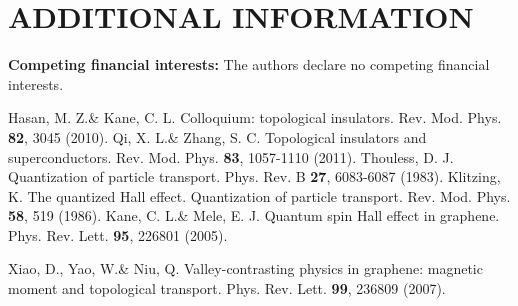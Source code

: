 \documentclass[aps,preprint,onecolumn,showpacs,superscriptaddress,groupedaddress]{revtex4}  %
\begin{document}
\section*{ADDITIONAL INFORMATION}
\textbf{Competing financial interests:} The authors declare no competing financial interests.

\begin{thebibliography}{99}
 Hasan, M. Z.\& Kane, C. L. Colloquium: topological insulators. Rev. Mod. Phys. \textbf{82}, 3045 (2010).
	Qi, X. L.\& Zhang, S. C. Topological insulators and superconductors. Rev. Mod. Phys. \textbf{83}, 1057-1110 (2011).
 Thouless, D. J. Quantization of particle transport. Phys. Rev. B \textbf{27}, 6083-6087 (1983).
 Klitzing, K. The quantized Hall effect. Quantization of particle transport. Rev. Mod. Phys. \textbf{58}, 519 (1986).
	Kane, C. L.\& Mele, E. J. Quantum spin Hall effect in graphene. Phys. Rev. Lett. \textbf{95}, 226801 (2005).




	Xiao, D., Yao, W.\& Niu, Q. Valley-contrasting physics in graphene: magnetic moment and topological transport. Phys. Rev. Lett.  \textbf{99}, 236809 (2007).


\end{thebibliography}
\end{document}

